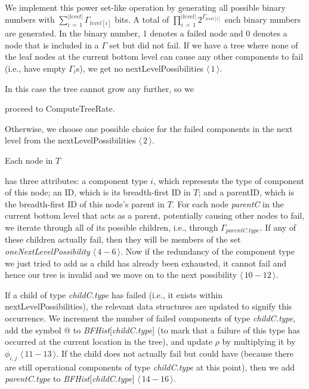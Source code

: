 \documentclass[12pt]{article}
\def\myxout{\bgroup \markoverwith{\textcolor{red}{\hbox to.35em{\hss/\hss}}}\ULon}
\newcommand{\deleted}[1]{}
\newcommand{\changed}[1]{#1}
\newcommand{\changed}[1]{\textcolor{red}{#1}}
\newcommand{\deleted}[1]{{\myxout{#1}}}
\newcommand{\varName}[1]{\textrm{\it#1}}
\newcommand{\citeLine}[1]{$\langle \, #1 \, \rangle$}
\newcommand{\citeBlock}[2]{$\langle \, #1 - #2 \, \rangle$}
\begin{document}
We implement this power set-like operation by generating all possible binary numbers with $\sum\limits_{i \, = \, 1}^{|level|}\Gamma_{level[i]}$ bits. A total of $\prod\limits_{i \, = \, 1}^{|level|}2^{\Gamma_{level[i]}}$ such binary numbers are generated. In the binary number, 1 denotes a failed node and 0 denotes a node that is included in a $\Gamma$ set but did not fail. If we have a tree where none of the leaf nodes at the current bottom level can cause any other components to fail (i.e., have empty $\Gamma_{i}$s), we get no nextLevelPossibilities \citeLine{1}.
\deleted{If there are no nextLevelPossibilities,}
\changed{In this case}
the tree cannot grow any further, so we
\deleted{would}
proceed to ComputeTreeRate.

Otherwise, we choose one possible choice for the failed components in the next level from the nextLevelPossibilities \citeLine{2}.
\deleted{To find out whether any new children will be added in the upcoming next level, we create a Boolean variable \varName{addedChildFlag}, initially with the value of False \citeLine{3}.}
Each node in $T$
\deleted{contains}
\changed{has}
three attributes: a component type $i$, which represents the type of \deleted{the failed} component of this node; an ID, which is its breadth-first ID in $T$; and a parentID, which is the breadth-first ID of this node's parent in $T$. For each node \varName{parentC} in the current bottom level that acts as a parent, potentially causing other nodes to fail, we iterate through all of its possible children, i.e., through $\Gamma_{parentC.type}$. If any of these children actually fail, then they will be members of the set \varName{oneNextLevelPossibility} \citeBlock{4}{6}. Now if the redundancy of the component type we just tried to add as a child has already been exhausted, it cannot fail and hence our tree is invalid and we move on to the next possibility \deleted{\citeBlock{7}{9}}
\changed{\citeBlock{10}{12}}.

If a child of type \varName{childC.type} has failed (i.e., it exists within nextLevelPossibilities), the relevant data structures are updated to signify this occurrence. We increment the number of failed components of 
\changed{type}
\varName{childC.type}, add the symbol @ to \varName{BFHist}[\varName{childC.type}] (to mark that a failure
\changed{of this type}
has occurred at \deleted{this}
\changed{the current}
location in the tree), and
\changed{update} $\rho$
\changed{by multiplying it by} $\phi_{i, j}$ \citeBlock{11}{13}. If the child does not actually fail but could have (because there are still operational components of type \varName{childC.type} at this point), then we add \varName{parentC.type} to \varName{BFHist}[\varName{childC.type}] \citeBlock{14}{16}.
\end{document}
